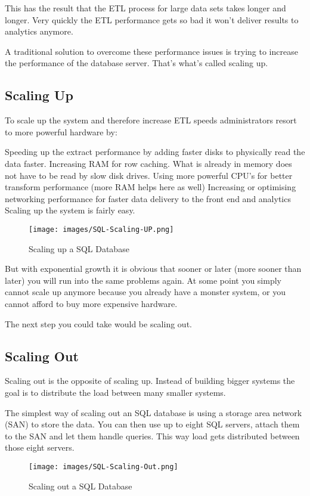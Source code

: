 \documentclass[12pt, numbers=noenddot]{scrreprt} %
\begin{document}
This has the result that the ETL process for large data sets takes longer and longer. Very quickly the ETL performance gets so bad it won’t deliver results to analytics anymore.

A traditional solution to overcome these performance issues is trying to increase the performance of the database server. That’s what’s called scaling up.

\subsection{Scaling Up}
To scale up the system and therefore increase ETL speeds administrators resort to more powerful hardware by:

Speeding up the extract performance by adding faster disks to physically read the data faster.
Increasing RAM for row caching. What is already in memory does not have to be read by slow disk drives.
Using more powerful CPU’s for better transform performance (more RAM helps here as well)
Increasing or optimising networking performance for faster data delivery to the front end and analytics
Scaling up the system is fairly easy.

\begin{figure}[htbp]
  \centering
     \texttt{[image: images/SQL-Scaling-UP.png]}
  \caption{Scaling up a SQL Database}
  \label{fig:Bild1}
\end{figure}

But with exponential growth it is obvious that sooner or later (more sooner than later) you will run into the same problems again. At some point you simply cannot scale up anymore because you already have a monster system, or you cannot afford to buy more expensive hardware.

The next step you could take would be scaling out.

\subsection{Scaling Out}
Scaling out is the opposite of scaling up. Instead of building bigger systems the goal is to distribute the load between many smaller systems.

The simplest way of scaling out an SQL database is using a storage area network (SAN) to store the data. You can then use up to eight SQL servers, attach them to the SAN and let them handle queries. This way load gets distributed between those eight servers.

\begin{figure}[htbp]
  \centering
     \texttt{[image: images/SQL-Scaling-Out.png]}
  \caption{Scaling out a SQL Database}
  \label{fig:Bild1}
\end{figure}
\end{document}
